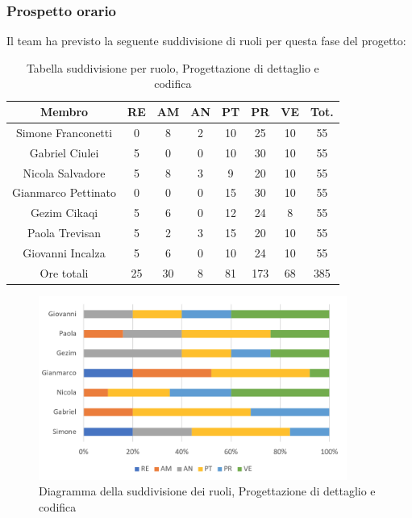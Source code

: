 \subsubsection{Prospetto orario}
Il team ha previsto la seguente suddivisione di ruoli per questa fase del progetto:
\begin{table}[h]
\caption{Tabella suddivisione per ruolo, Progettazione di dettaglio e codifica}  
\begin{center}
\begin{tabular}{ |c|c|c|c|c|c|c|c|  }
 \hline
 Membro 		& RE 	& AM 	& AN 	& PT 	& PR 	& VE 	& Tot.\\
 \hline\hline
 Simone	Franconetti		& 0 		& 8		& 2 	& 10 	& 25 		& 10 		& 55\\
 Gabriel Ciulei		& 5 		& 0 		& 0 	& 10		& 30 		& 10 		& 55\\
 Nicola	Salvadore		& 5 		& 8 		& 3 	& 9 		& 20 		& 10 		& 55\\
 Gianmarco	Pettinato	& 0 		& 0 		& 0 	& 15 	& 30 		& 10 		& 55\\
 Gezim	Cikaqi		& 5 		& 6 		& 0 	& 12 	& 24 		& 8	 		& 55\\
 Paola	Trevisan		& 5 		& 2 		& 3 	& 15 	& 20 		& 10 		& 55\\
 Giovanni	Incalza	& 5 		& 6	 	& 0 	& 10 	& 24 		& 10  		& 55\\
 \hline\hline
 Ore totali		& 25		& 30		& 8 	& 81	 	& 173 	& 68 	& 385\\
  \hline
\end{tabular}
\end{center}
\end{table}
\begin{figure}[h!]
	\centering
	\includegraphics[width=0.9\textwidth]{res/img/hi33}
	\caption{Diagramma della suddivisione dei ruoli, Progettazione di dettaglio e codifica}
\end{figure}

